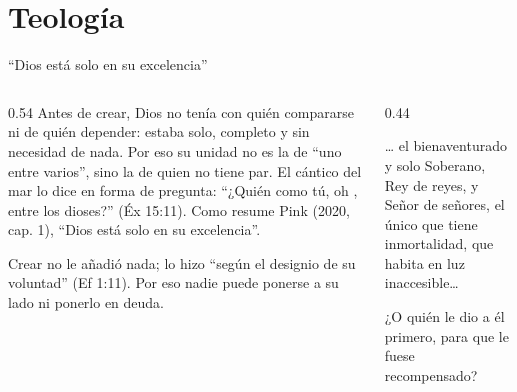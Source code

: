 \section{Teología}

\begin{frame}{``Dios está solo en su excelencia''}
\begin{columns}[t,onlytextwidth]
\begin{column}{0.54\textwidth}\small
Antes de crear, Dios no tenía con quién compararse ni de quién depender: estaba solo, completo y sin necesidad de nada. Por eso su unidad no es la de ``uno entre varios'', sino la de quien no tiene par. El cántico del mar lo dice en forma de pregunta: ``¿Quién como tú, oh \SENOR, entre los dioses?'' (Éx 15:11). Como resume Pink (2020, cap. 1), ``Dios está solo en su excelencia''.\par\smallskip
Crear no le añadió nada; lo hizo ``según el designio de su voluntad'' (Ef 1:11). Por eso nadie puede ponerse a su lado ni ponerlo en deuda.
\end{column}
\begin{column}{0.44\textwidth}
\begin{cita}[fontupper=\scriptsize\itshape]\ldots{} el bienaventurado y solo Soberano, Rey de reyes, y Señor de señores, el único que tiene inmortalidad, que habita en luz inaccesible\ldots{}\end{cita}
\begin{cita}[fontupper=\scriptsize\itshape]¿O quién le dio a él primero, para que le fuese recompensado?\end{cita}
\end{column}
\end{columns}
\end{frame}

